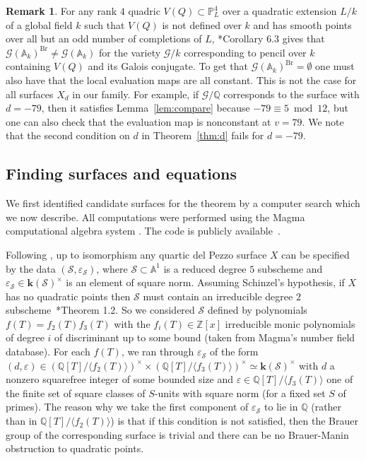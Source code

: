\documentclass[12pt, reqno]{amsart}
\theoremstyle{definition}
\newtheorem{rmk}[lemma]{Remark}
\newcommand{\A}{{\mathbb A}}
\newcommand{\PP}{{\mathbb P}}
\newcommand{\Q}{{\mathbb Q}}
\newcommand{\Z}{{\mathbb Z}}
\newcommand{\kk}{{\mathbf k}}
\newcommand{\calG}{{\mathcal G}}
\newcommand{\scrS}{{\mathscr S}}
\DeclareMathOperator{\Br}{Br}
\newcommand{\eps}{\varepsilon}
\begin{document}
\begin{rmk}
	For any rank $4$ quadric $V(Q) \subset \PP^4_L$ over a quadratic extension $L/k$ of a global field $k$ such that $V(Q)$ is not defined over $k$ and has smooth points over all but an odd number of completions of $L$,  \cite{CV}*{Corollary 6.3} gives that $\calG(\A_k)^{\Br} \ne \calG(\A_k)$ for the variety $\calG/k$ corresponding to pencil over $k$ containing $V(Q)$ and its Galois conjugate. To get that $\calG(\A_k)^{\Br} = \emptyset$ one must also have that the local evaluation maps are all constant. This is not the case for all surfaces \(X_d\) in our family. For example, if $\calG/\Q$ corresponds to the surface with $d = -79$, then it satisfies Lemma~\ref{lem:compare} because $-79 \equiv 5 \bmod 12$, but one can also check that the evaluation map is nonconstant at $v = 79$. We note that the second condition on $d$ in Theorem~\ref{thm:d} fails for $d = -79$.
\end{rmk}


\subsection{Finding surfaces and equations}\label{sec:finding}

We first identified candidate surfaces for the theorem by a computer search which we now describe. All computations were performed using the Magma computational algebra system \cite{BCP}. The code is publicly available~\cite{code}.

Following \cite{Flynn}, up to isomorphism any quartic del Pezzo surface \(X\) can be specified by the data $(\scrS,\eps_\scrS)$, where $\scrS \subset \A^1$ is a reduced degree $5$ subscheme and $\eps_\scrS \in \kk(\scrS)^\times$ is an element of square norm. Assuming Schinzel's hypothesis, if \(X\) has no quadratic points then $\scrS$ must contain an irreducible degree $2$ subscheme~\cite{CV}*{Theorem 1.2}. So we considered $\scrS$ defined by polynomials $f(T) = f_2(T)f_3(T)$ with the $f_i(T) \in \Z[x]$ irreducible monic polynomials of degree $i$ of discriminant up to some bound (taken from Magma's number field database). For each $f(T)$, we ran through $\eps_\scrS$ of the form $(d,\eps)\in (\Q[T]/\langle f_2(T)\rangle)^{\times} \times (\Q[T]/\langle f_3(T)\rangle)^{\times}\simeq \kk(\scrS)^{\times}$ with $d$ a nonzero squarefree integer of some bounded size and $\eps \in \Q[T]/\langle f_3(T) \rangle$ one of the finite set of square classes of $S$-units with square norm (for a fixed set $S$ of primes). The reason why we take the first component of $\eps_\scrS$ to lie in $\Q$ (rather than in $\Q[T]/\langle f_2(T)\rangle$) is that if this condition is not satisfied, then the Brauer group of the corresponding surface is trivial and there can be no Brauer-Manin obstruction to quadratic points.
\end{document}
